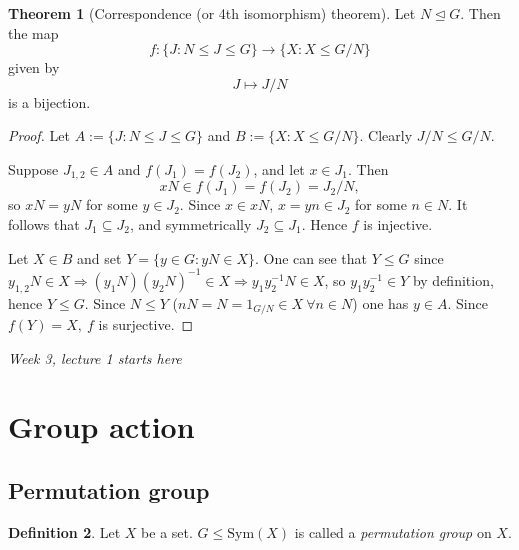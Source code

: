 \documentclass[a4paper]{article}
\newcommand{\Sym}{\text{Sym}}
\theoremstyle{definition}
\newtheorem{defn}{Definition}[subsection]
\newtheorem{thm}[defn]{Theorem}
\begin{document}
\begin{thm}[Correspondence (or 4th isomorphism) theorem]
\label{thm:correspondence}
Let $N\unlhd G$. Then the map
\[
f:\{J:N\leq J\leq G\} \rightarrow \{X:X\leq G/N\}
\]
given by
\[
J\mapsto J/N
\]
is a bijection.
\end{thm}
\begin{proof}
Let $A:=\{J:N\leq J\leq G\}$ and $B:=\{X:X\leq G/N\}$. Clearly $J/N\leq G/N$.

Suppose $J_{1,2}\in A$ and $f(J_1)=f(J_2)$, and let $x\in J_1$. Then
\[
xN\in f(J_1)=f(J_2)=J_2/N,
\]
so $xN=yN$ for some $y\in J_2$. Since $x\in xN$, $x=yn\in J_2$ for some $n\in N$. It follows that $J_1\subseteq J_2$, and symmetrically $J_2\subseteq J_1$. Hence $f$ is injective.

Let $X\in B$ and set $Y=\{y\in G:yN\in X\}$. One can see that $Y\leq G$ since $y_{1,2}N\in X\Rightarrow (y_1N)(y_2N)^{-1}\in X\Rightarrow y_1y_2^{-1}N \in X$, so $y_1y_2^{-1}\in Y$ by definition, hence $Y\leq G$. Since $N\leq Y$ ($nN=N=1_{G/N}\in X \ \forall n\in N$) one has $y\in A$. Since $f(Y)=X,\ f$ is surjective.
\end{proof}

\begin{flushright}
\textit{Week 3, lecture 1 starts here}
\end{flushright}

\section{Group action}
\subsection{Permutation group}
\begin{defn}
Let $X$ be a set. $G\leq\Sym(X)$ is called a \textit{permutation group} on $X$.
\end{defn}
\end{document}
